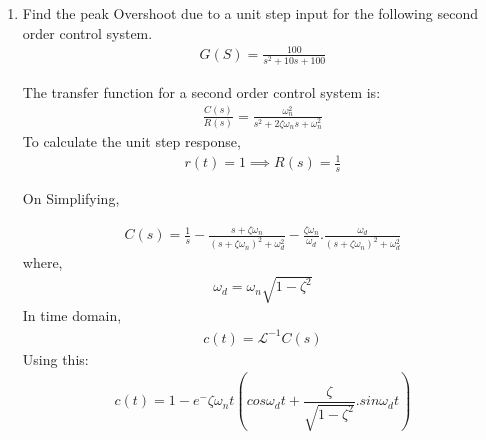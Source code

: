 \begin{enumerate}[label=\thesubsection.\arabic*.,ref=\thesubsection.\theenumi]
\item Find the peak Overshoot due to a unit step input for the following second order control system.
\begin{align}
    G(S) = \frac{100}{s^2 + 10s +100}    
\end{align}

\solution
The transfer function for a second order control system is:
\begin{align}
    \frac{C(s)}{R(s)}= \frac{\omega_n^2}{s^2 + 2\zeta\omega_ns + \omega_n^2}
\end{align}
To calculate the unit step response,
\begin{align}
    r(t) = 1 \implies R(s) = \frac{1}{s}    
\end{align}

On Simplifying, 

\begin{align}
    C(s) = \frac{1}{s}-\frac{s+\zeta\omega_n}{(s + \zeta\omega_n)^2 + \omega_d^2} - \frac{\zeta\omega_n}{\omega_d}.\frac{\omega_d}{(s + \zeta\omega_n)^2 + \omega_d^2}  
\end{align}
where, 
\begin{align}
    \omega_d=\omega_n\sqrt{1-\zeta^2}
\end{align}
In time domain, 
\begin{align}
    c(t) = \mathcal{L}^{-1}{C(s)}
\end{align}
Using this:
\begin{align}
    c(t) = 1 - e^-\zeta\omega_nt(cos\omega_dt+\dfrac{\zeta}{\sqrt{1-\zeta^2}}.sin\omega_dt)
    \label{eq:eebtech11045_ct}
\end{align}


\end{enumerate}
